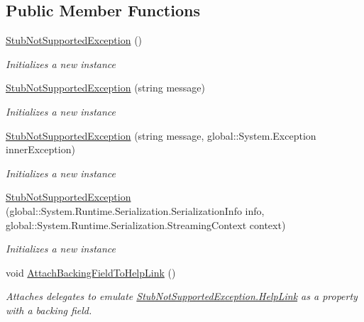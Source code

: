 \subsection*{Public Member Functions}
\begin{DoxyCompactItemize}
\item 
\hyperlink{class_system_1_1_fakes_1_1_stub_not_supported_exception_a20ba10f0da1ceeda87f1709493d6d883}{Stub\-Not\-Supported\-Exception} ()
\begin{DoxyCompactList}\small\item\em Initializes a new instance\end{DoxyCompactList}\item 
\hyperlink{class_system_1_1_fakes_1_1_stub_not_supported_exception_a7940da7d59aed05f655e9c04a0796ab6}{Stub\-Not\-Supported\-Exception} (string message)
\begin{DoxyCompactList}\small\item\em Initializes a new instance\end{DoxyCompactList}\item 
\hyperlink{class_system_1_1_fakes_1_1_stub_not_supported_exception_acb8bffed04fb7e106922ea7823176242}{Stub\-Not\-Supported\-Exception} (string message, global\-::\-System.\-Exception inner\-Exception)
\begin{DoxyCompactList}\small\item\em Initializes a new instance\end{DoxyCompactList}\item 
\hyperlink{class_system_1_1_fakes_1_1_stub_not_supported_exception_a4ec7e1588b12e5a4e910006147e465d9}{Stub\-Not\-Supported\-Exception} (global\-::\-System.\-Runtime.\-Serialization.\-Serialization\-Info info, global\-::\-System.\-Runtime.\-Serialization.\-Streaming\-Context context)
\begin{DoxyCompactList}\small\item\em Initializes a new instance\end{DoxyCompactList}\item 
void \hyperlink{class_system_1_1_fakes_1_1_stub_not_supported_exception_a261623030f16e8dbbf1e71287904f150}{Attach\-Backing\-Field\-To\-Help\-Link} ()
\begin{DoxyCompactList}\small\item\em Attaches delegates to emulate \hyperlink{class_system_1_1_fakes_1_1_stub_not_supported_exception_abd2f586fbc7a33cb644460f575eb10d7}{Stub\-Not\-Supported\-Exception.\-Help\-Link} as a property with a backing field.\end{DoxyCompactList}\item 

\end{DoxyCompactItemize}
